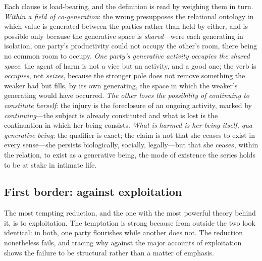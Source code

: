 Each clause is load-bearing, and the definition is read by weighing them in turn. \emph{Within a field of co-generation}: the wrong presupposes the relational ontology in which value is generated between the parties rather than held by either, and is possible only because the generative space is \emph{shared}---were each generating in isolation, one party's productivity could not occupy the other's room, there being no common room to occupy. \emph{One party's generative activity occupies the shared space}: the agent of harm is not a vice but an activity, and a good one; the verb is \emph{occupies}, not \emph{seizes}, because the stronger pole does not remove something the weaker had but fills, by its own generating, the space in which the weaker's generating would have occurred. \emph{The other loses the possibility of continuing to constitute herself}: the injury is the foreclosure of an ongoing activity, marked by \emph{continuing}---the subject is already constituted and what is lost is the continuation in which her being consists. \emph{What is harmed is her being itself, qua generative being}: the qualifier is exact; the claim is not that she ceases to exist in every sense---she persists biologically, socially, legally---but that she ceases, within the relation, to exist as a generative being, the mode of existence the series holds to be at stake in intimate life.

\subsection{First border: against exploitation}
\label{p18:sub:def-exploitation}

The most tempting reduction, and the one with the most powerful theory behind it, is to exploitation. The temptation is strong because from outside the two look identical: in both, one party flourishes while another does not. The reduction nonetheless fails, and tracing why against the major accounts of exploitation shows the failure to be structural rather than a matter of emphasis.

